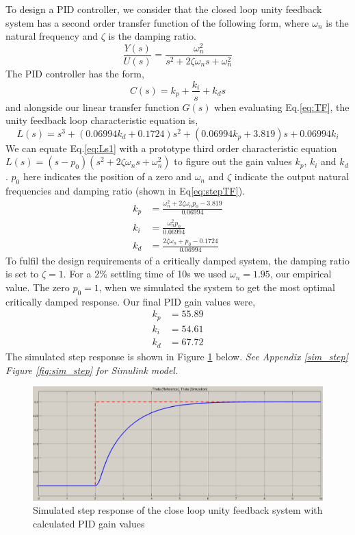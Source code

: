 \documentclass[11pt]{article}
\begin{document}
To design a PID controller, we consider that the closed loop unity feedback system has a second order transfer function of the following form, where $\omega_n$ is the natural frequency and $\zeta$ is the damping ratio.
\begin{equation}\label{eq:stepTF}
    \frac{Y(s)}{U(s)} = \frac{\omega_n^2}{s^2 + 2\zeta \omega_n s + \omega_n^2}
\end{equation}
The PID controller has the form,
\begin{equation}\label{eq:Cs}
    C(s) = k_p + \frac{k_i}{s} + k_d s
\end{equation}
and alongside our linear transfer function $G(s)$ when evaluating Eq.\ref{eq:TF}, the unity feedback loop characteristic equation is,
\begin{equation}\label{eq:Ls1}
    L(s) = s^3 + (0.06994k_d + 0.1724)s^2 + (0.06994k_p + 3.819)s + 0.06994k_i
\end{equation}
We can equate Eq.\ref{eq:Ls1} with a prototype third order characteristic equation $L(s) = (s - p_0)(s^2 + 2\zeta \omega_n s + \omega_n^2)$ to figure out the gain values $k_p$, $k_i$ and $k_d$. $p_0$ here indicates the position of a zero and $\omega_n$ and $\zeta$ indicate the output natural frequencies and damping ratio (shown in Eq\ref{eq:stepTF}).
\begin{align*}
    k_p &= \frac{\omega_n^2 + 2\zeta \omega_n p_0 - 3.819}{0.06994}\\
    k_i &= \frac{\omega_n^2 p_0}{0.06994}\\
    k_d &= \frac{2\zeta \omega_n + p_0 - 0.1724}{0.06994}
\end{align*}
To fulfil the design requirements of a critically damped system, the damping ratio is set to $\zeta = 1$. For a 2\% settling time of 10s we used $\omega_n = 1.95$, our empirical value. The zero $p_0 = 1$, when we simulated the system to get the most optimal critically damped response. Our final PID gain values were,
\begin{align*}
    k_p &= 55.89\\
    k_i &= 54.61\\
    k_d &= 67.72
\end{align*}
The simulated step response is shown in Figure \ref{fig:W2Step} below. 
\textit{See Appendix \ref{sim_step} Figure \ref{fig:sim_step} for Simulink model.}
\begin{figure}[ht!]
    \centering
    \includegraphics[scale=0.5]{WS2_Fig4_B.PNG} %
    \caption{Simulated step response of the close loop unity feedback system with calculated PID gain values}
    \label{fig:W2Step}
\end{figure}
\end{document}
